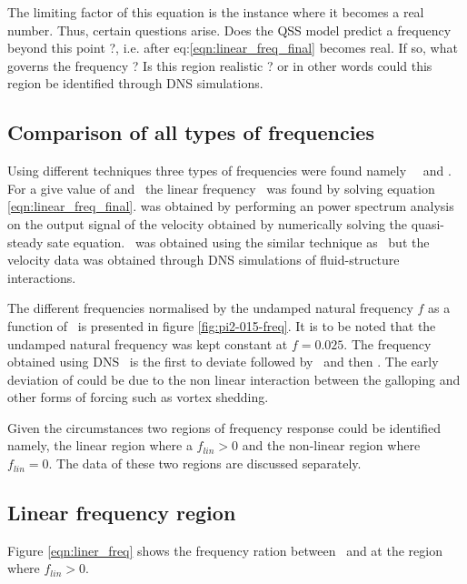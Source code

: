 The limiting factor of this equation is the instance where it becomes a real number. Thus, certain questions arise. Does the QSS model predict a frequency beyond this point ?, i.e. after eq:\ref{eqn:linear_freq_final} becomes real. If so, what governs the frequency ? Is this region realistic ? or in other words could this region be identified through DNS simulations. 

\subsection{Comparison of all types of frequencies}

Using different techniques three types of frequencies were found namely \freqlin\ \freqqss\ and \freqdns. For a give value of \massstiff and \massdamp\, the linear frequency \freqlin\ was found by solving equation \ref{eqn:linear_freq_final}. \freqqss was obtained by performing an power spectrum analysis on the output signal of the velocity obtained by numerically solving the quasi-steady sate equation. \freqdns\ was obtained using the similar technique as \freqqss\ but the velocity data was obtained through DNS simulations of fluid-structure interactions. 



The different frequencies normalised by the undamped natural frequency $f$ as a function of \massstiff\ is presented in figure \ref{fig:pi2-015-freq}. It is to be noted that the undamped natural frequency was kept constant at $f=0.025$. The frequency obtained using DNS \freqdns\ is the first to deviate followed by \freqqss\ and then \freqlin. The early deviation of \freqdns could be due to the non linear interaction between the galloping and other forms of forcing such as vortex shedding.

Given the circumstances two regions of frequency response could be identified namely, the linear region where a $f_{lin}>0$ and the non-linear region where $f_{lin}=0$. The data of these two regions are discussed separately.

\subsection{Linear frequency region}

Figure \ref{eqn:liner_freq} shows the frequency ration between \freqlin\ and \freqqss at the region where $f_{lin}>0$. 


